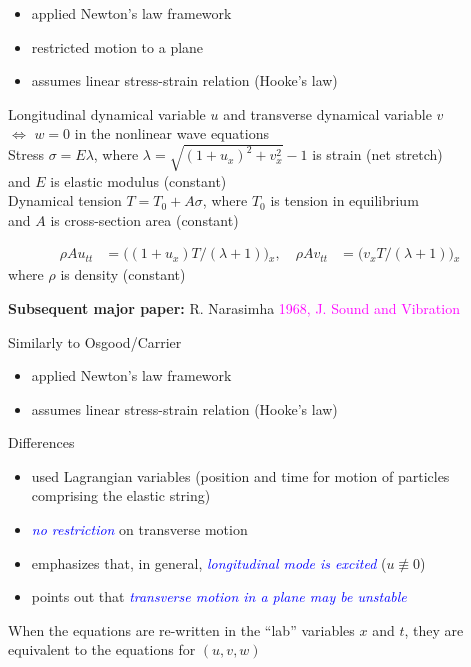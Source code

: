\documentclass[landscape]{slides}
\def\myref#1{\textcolor{magenta}{\small #1}}
\def\myemph#1{\textcolor{blue}{\em #1}}
\begin{document}
\begin{itemize}
\item
applied Newton's law framework
\item
restricted motion to a plane 
\item
assumes linear stress-strain relation (Hooke's law) 
\end{itemize}
\hfil

Longitudinal dynamical variable $u$ and transverse dynamical variable $v$\\
$\Longleftrightarrow$ $w=0$ in the nonlinear wave equations 
\\

Stress $\sigma = E\lambda$, 
where $\lambda = \sqrt{(1+u_x)^2 + v_x^2} -1$ is strain (net stretch)\\
and $E$ is elastic modulus (constant)
\\

Dynamical tension $T = T_0 + A\sigma$,
where $T_0$ is tension in equilibrium\\
and $A$ is cross-section area (constant)

\[\begin{aligned}
\rho A u_{tt} & = \big( (1+u_x)T/(\lambda +1) \big){}_x, 
\quad
\rho A v_{tt} & = \big( v_xT/(\lambda +1) \big){}_x
\end{aligned}\]
where $\rho$ is density (constant)

\newpage
\textbf{Subsequent major paper:} R. Narasimha \myref{1968, J. Sound and Vibration}

Similarly to Osgood/Carrier
\begin{itemize}
\item
applied Newton's law framework 
\item
assumes linear stress-strain relation (Hooke's law) 
\end{itemize}
\hfil

Differences
\begin{itemize}
\item
used Lagrangian variables (position and time for motion of particles comprising the elastic string)
\item
\myemph{no restriction} on transverse motion 
\item
emphasizes that, in general, \myemph{longitudinal mode is excited} ($u\not\equiv 0$)
\item
points out that \myemph{transverse motion in a plane may be unstable}
\end{itemize}
\hfil

When the equations are re-written in the ``lab'' variables $x$ and $t$, 
they are equivalent to the equations for $(u,v,w)$
\end{document}
